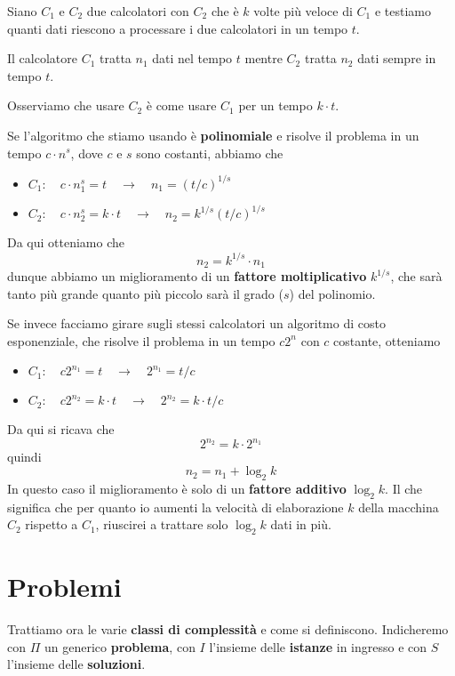 \begin{example}
	Siano $C_1$ e $C_2$ due calcolatori con $C_2$ che \`e $k$ volte pi\`u veloce di $C_1$ e testiamo quanti dati
	riescono a processare i due calcolatori in un tempo $t$.

	Il calcolatore $C_1$ tratta $n_1$ dati nel tempo $t$ mentre $C_2$ tratta $n_2$ dati sempre in tempo $t$.

	Osserviamo che usare $C_2$ \`e come usare $C_1$ per un tempo $k \cdot t$.

	Se l'algoritmo che stiamo usando \`e \textbf{polinomiale} e risolve il problema in un tempo $c \cdot n^s$, dove
	$c$ e $s$ sono costanti, abbiamo che
	\begin{itemize}
		\item $C_1 : \quad c \cdot n_1^s = t \quad \rightarrow \quad n_1 = (t / c)^{1/s}$
		\item $C_2 : \quad c \cdot n_2^s = k \cdot t \quad \rightarrow \quad n_2 = k^{1/s}(t / c)^{1/s}$
	\end{itemize}
	Da qui otteniamo che
	\[ n_2 = k^{1/s} \cdot n_1 \]
	dunque abbiamo un miglioramento di un \textbf{fattore moltiplicativo} $k^{1/s}$, che sar\`a tanto pi\`u grande
	quanto pi\`u piccolo sar\`a il grado ($s$) del polinomio.

	Se invece facciamo girare sugli stessi calcolatori un algoritmo di costo esponenziale, che risolve il problema in
	un tempo $c 2^n$ con $c$ costante, otteniamo
	\begin{itemize}
		\item $C_1 : \quad c 2^{n_1} = t \quad \rightarrow \quad 2^{n_1} = t / c$
		\item $C_2 : \quad c 2^{n_2} = k \cdot t \quad \rightarrow \quad 2^{n_2} = k \cdot t/c$
	\end{itemize}
	Da qui si ricava che
	\[ 2^{n_2} = k \cdot 2^{n_1} \]
	quindi
	\[ n_2 = n_1 + \log_2 k \]
	In questo caso il miglioramento \`e solo di un \textbf{fattore additivo} $\log_2 k$. Il che significa che per quanto
	io aumenti la velocit\`a di elaborazione $k$ della macchina $C_2$ rispetto a $C_1$, riuscirei a trattare solo
	$\log_2 k$ dati in pi\`u.
\end{example}

\section{Problemi}\label{problemi}
Trattiamo ora le varie \textbf{classi di complessit\`a} e come si definiscono. Indicheremo con $\Pi$ un generico
\textbf{problema}, con $I$ l'insieme delle \textbf{istanze} in ingresso e con $S$ l'insieme delle \textbf{soluzioni}.

